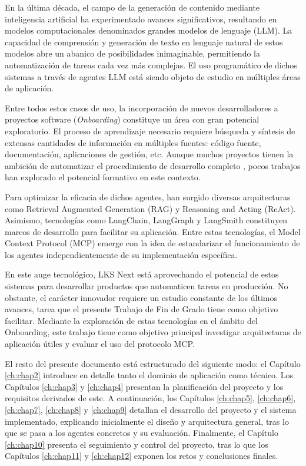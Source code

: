 En la última década, el campo de la generación de contenido mediante inteligencia artificial ha experimentado avances significativos, resultando en modelos computacionales denominados grandes modelos de lenguaje (LLM). La capacidad de comprensión y generación de texto en lenguaje natural de estos modelos abre un abanico de posibilidades inimaginable, permitiendo la automatización de tareas cada vez más complejas. El uso programático de dichos sistemas a través de agentes LLM está siendo objeto de estudio en múltiples áreas de aplicación.

Entre todos estos casos de uso, la incorporación de nuevos desarrolladores a proyectos software (\textit{Onboarding}) constituye un área con gran potencial exploratorio. El proceso de aprendizaje necesario requiere búsqueda y síntesis de extensas cantidades de información en múltiples fuentes: código fuente, documentación, aplicaciones de gestión, etc. Aunque muchos proyectos tienen la ambición de automatizar el procedimiento de desarrollo completo \cite{}, pocos trabajos han explorado el potencial formativo en este contexto.

Para optimizar la eficacia de dichos agentes, han surgido diversas arquitecturas como Retrieval Augmented Generation (RAG) y Reasoning and Acting (ReAct). Asimismo, tecnologías como LangChain, LangGraph y LangSmith constituyen marcos de desarrollo para facilitar su aplicación. Entre estas tecnologías, el Model Context Protocol (MCP) emerge con la idea de estandarizar el funcionamiento de los agentes independientemente de su implementación específica.

En este auge tecnológico, LKS Next está aprovechando el potencial de estos sistemas para desarrollar productos que automaticen tareas en producción. No obstante, el carácter innovador requiere un estudio constante de los últimos avances, tarea que el presente Trabajo de Fin de Grado tiene como objetivo facilitar. Mediante la exploración de estas tecnologías en el ámbito del Onboarding, este trabajo tiene como objetivo principal investigar arquitecturas de aplicación útiles y evaluar el uso del protocolo MCP.

El resto del presente documento está estructurado del siguiente modo: el Capítulo \ref{ch:chap2} introduce en detalle tanto el dominio de aplicación como técnico. Los Capítulos \ref{ch:chap3} y \ref{ch:chap4} presentan la planificación del proyecto y los requisitos derivados de este. A continuación, los Capítulos \ref{ch:chap5}, \ref{ch:chap6}, \ref{ch:chap7}, \ref{ch:chap8} y \ref{ch:chap9} detallan el desarrollo del proyecto y el sistema implementado, explicando inicialmente el diseño y arquitectura general, tras lo que se pasa a los agentes concretos y su evaluación. Finalmente, el Capítulo \ref{ch:chap10} presenta el seguimiento y control del proyecto, tras lo que los Capítulos \ref{ch:chap11} y \ref{ch:chap12} exponen los retos y conclusiones finales.
